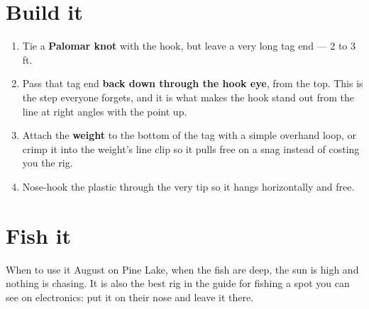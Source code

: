 \section{Build it}
\begin{enumerate}
\item Tie a \textbf{Palomar knot} with the hook, but leave a very long tag end --- 2 to 3 ft.
\item Pass that tag end \textbf{back down through the hook eye}, from the top. This is the step everyone forgets, and it is what makes the hook stand out from the line at right angles with the point up.
\item Attach the \textbf{weight} to the bottom of the tag with a simple overhand loop, or crimp it into the weight's line clip so it pulls free on a snag instead of costing you the rig.
\item Nose-hook the plastic through the very tip so it hangs horizontally and free.
\end{enumerate}

\section{Fish it}
\begin{telosfacts}[0.20]
\end{telosfacts}

\begin{telospanel}{When to use it}
August on Pine Lake, when the fish are deep, the sun is high and nothing is chasing. It is also the best rig in the guide for fishing a spot you can see on electronics: put it on their nose and leave it there.
\end{telospanel}

